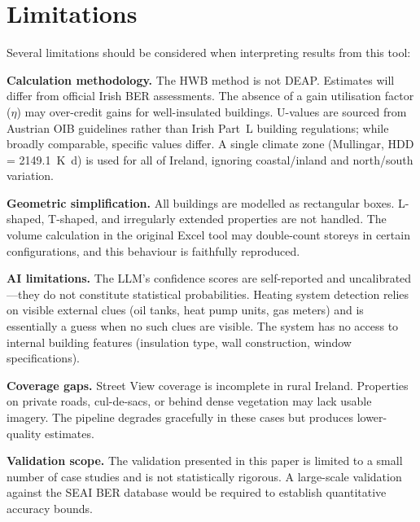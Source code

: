 \documentclass[preprint,12pt,authoryear]{elsarticle}
\begin{document}
\section{Limitations}
\label{sec:limitations}

Several limitations should be considered when interpreting results from this tool:

\textbf{Calculation methodology.} The HWB method is not DEAP. Estimates will differ from official Irish BER assessments. The absence of a gain utilisation factor ($\eta$) may over-credit gains for well-insulated buildings. U-values are sourced from Austrian OIB guidelines rather than Irish Part~L building regulations; while broadly comparable, specific values differ. A single climate zone (Mullingar, HDD = \SI{2149.1}{\kelvin\day}) is used for all of Ireland, ignoring coastal/inland and north/south variation.

\textbf{Geometric simplification.} All buildings are modelled as rectangular boxes. L-shaped, T-shaped, and irregularly extended properties are not handled. The volume calculation in the original Excel tool may double-count storeys in certain configurations, and this behaviour is faithfully reproduced.

\textbf{AI limitations.} The LLM's confidence scores are self-reported and uncalibrated---they do not constitute statistical probabilities. Heating system detection relies on visible external clues (oil tanks, heat pump units, gas meters) and is essentially a guess when no such clues are visible. The system has no access to internal building features (insulation type, wall construction, window specifications).

\textbf{Coverage gaps.} Street View coverage is incomplete in rural Ireland. Properties on private roads, cul-de-sacs, or behind dense vegetation may lack usable imagery. The pipeline degrades gracefully in these cases but produces lower-quality estimates.

\textbf{Validation scope.} The validation presented in this paper is limited to a small number of case studies and is not statistically rigorous. A large-scale validation against the SEAI BER database would be required to establish quantitative accuracy bounds.

\end{document}
